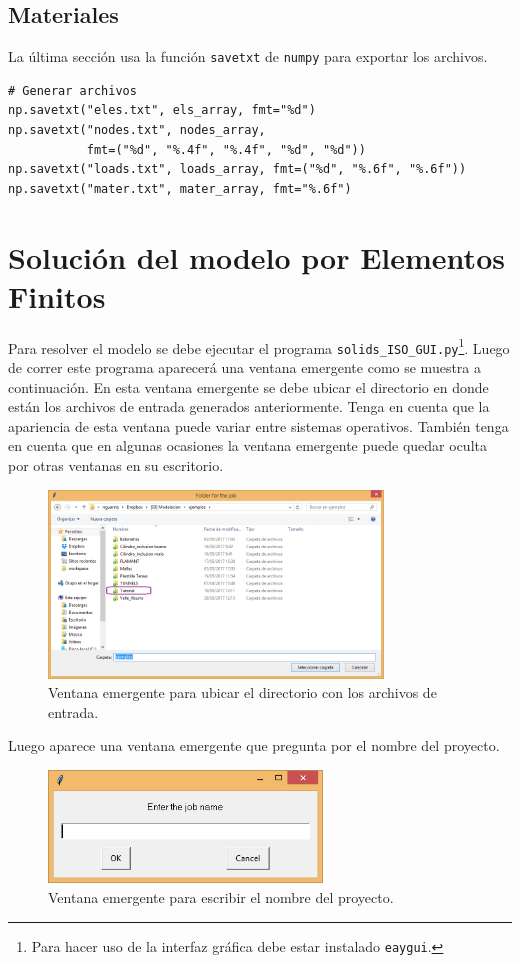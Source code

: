 \documentclass[12pt,letterpaper]{article}
\newcommand{\mintpy}[1]{\texttt{#1}}
\begin{document}
\subsection{Materiales}
La última sección usa la función \mintpy{savetxt} de \texttt{numpy} para exportar los archivos.
\begin{verbatim}
# Generar archivos
np.savetxt("eles.txt", els_array, fmt="%d")
np.savetxt("nodes.txt", nodes_array,
           fmt=("%d", "%.4f", "%.4f", "%d", "%d"))
np.savetxt("loads.txt", loads_array, fmt=("%d", "%.6f", "%.6f"))
np.savetxt("mater.txt", mater_array, fmt="%.6f")
\end{verbatim}


\section{Solución del modelo por Elementos Finitos}
Para resolver el modelo se debe ejecutar el programa \texttt{solids\_ISO\_GUI.py}\footnote{Para hacer uso de la interfaz gráfica debe estar instalado \texttt{eaygui}.}. Luego de correr este programa aparecerá una ventana emergente como se muestra a continuación. En esta ventana emergente se debe ubicar el directorio en donde están los archivos de entrada generados anteriormente. Tenga en cuenta que la apariencia de esta ventana puede variar entre sistemas operativos. También tenga en cuenta que en algunas ocasiones la ventana emergente puede quedar oculta por otras ventanas en su escritorio.
\begin{figure}[H]
    \centering
    \includegraphics[height=5cm]{img/solids_ISO-ventana.png} 
    \caption{Ventana emergente para ubicar el directorio con los archivos de entrada.}
\end{figure}

Luego aparece una ventana emergente que pregunta por el nombre del proyecto.
\begin{figure}[H]
    \centering
    \includegraphics[height=3cm]{img/solids_ISO-nombre.png} 
    \caption{Ventana emergente para escribir el nombre del proyecto.}
\end{figure}
\end{document}
